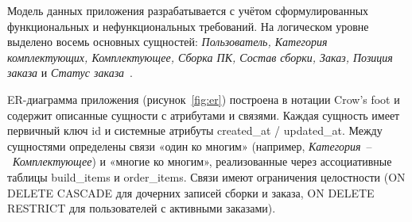 Модель данных приложения разрабатывается с учётом сформулированных функциональных и нефункциональных требований. На логическом уровне выделено восемь основных сущностей: \emph{Пользователь, Категория комплектующих, Комплектующее, Сборка ПК, Состав сборки, Заказ, Позиция заказа} и \emph{Статус заказа}~\cite{markov2021}.

ER-диаграмма приложения (рисунок~\ref{fig:er}) построена в нотации Crow's foot и содержит описанные сущности с атрибутами и связями. Каждая сущность имеет первичный ключ id и системные атрибуты created\_at / updated\_at. Между сущностями определены связи «один ко многим» (например, \emph{Категория}~--~\emph{Комплектующее}) и «многие ко многим», реализованные через ассоциативные таблицы build\_items и order\_items. Связи имеют ограничения целостности (ON DELETE CASCADE для дочерних записей сборки и заказа, ON DELETE RESTRICT для пользователей с активными заказами).

